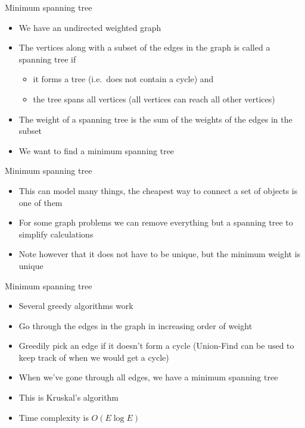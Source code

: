 \documentclass{beamer}
\begin{document}
\begin{frame}[plain]{Minimum spanning tree}
    \begin{itemize}
        \item We have an undirected weighted graph
        \item The vertices along with a subset of the edges in the graph is called a spanning tree if
            \begin{itemize}
                \item it forms a tree (i.e.\ does not contain a cycle) and
                \item the tree spans all vertices (all vertices can reach all other vertices)
            \end{itemize}
        \vspace{10pt}
        \item The weight of a spanning tree is the sum of the weights of the edges in the subset
        \vspace{10pt}
        \item We want to find a minimum spanning tree
    \end{itemize}
\end{frame}

\begin{frame}[plain]{Minimum spanning tree}
    \begin{itemize}
        \item This can model many things, the cheapest way to connect a set of objects is one of them
        \item For some graph problems we can remove everything but a spanning tree to simplify calculations
        \item Note however that it does not have to be unique, but the minimum weight is unique
    \end{itemize}
\end{frame}

\begin{frame}[plain]{Minimum spanning tree}
    \begin{itemize}
        \item Several greedy algorithms work
        \vspace{10pt}
        \item Go through the edges in the graph in increasing order of weight
        \item Greedily pick an edge if it doesn't form a cycle (Union-Find can be used to keep track of when we would get a cycle)
        \item When we've gone through all edges, we have a minimum spanning tree
        \vspace{10pt}
        \item This is Kruskal's algorithm
        \item Time complexity is $O(E \log E)$
    \end{itemize}
\end{frame}
\end{document}
